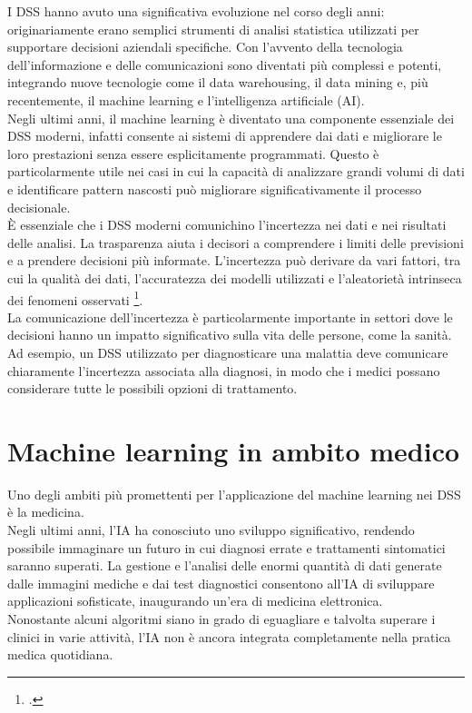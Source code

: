 I DSS hanno avuto una significativa evoluzione nel corso degli anni: originariamente erano semplici strumenti di analisi statistica utilizzati per supportare decisioni aziendali specifiche. Con l'avvento della tecnologia dell'informazione e delle comunicazioni sono diventati più complessi e potenti, integrando nuove tecnologie come il data warehousing, il data mining e, più recentemente, il machine learning e l'intelligenza artificiale (AI).\\
Negli ultimi anni, il machine learning è diventato una componente essenziale dei DSS moderni, infatti consente ai sistemi di apprendere dai dati e migliorare le loro prestazioni senza essere esplicitamente programmati. Questo è particolarmente utile nei casi in cui la capacità di analizzare grandi volumi di dati e identificare pattern nascosti può migliorare significativamente il processo decisionale.\\
È essenziale che i DSS moderni comunichino l'incertezza nei dati e nei risultati delle analisi. La trasparenza aiuta i decisori a comprendere i limiti delle previsioni e a prendere decisioni più informate. L'incertezza può derivare da vari fattori, tra cui la qualità dei dati, l'accuratezza dei modelli utilizzati e l'aleatorietà intrinseca dei fenomeni osservati \footcite{womak:role-decision-making}.\\
La comunicazione dell'incertezza è particolarmente importante in settori dove le decisioni hanno un impatto significativo sulla vita delle persone, come la sanità. Ad esempio, un DSS utilizzato per diagnosticare una malattia deve comunicare chiaramente l'incertezza associata alla diagnosi, in modo che i medici possano considerare tutte le possibili opzioni di trattamento.\\


\section{Machine learning in ambito medico }

Uno degli ambiti più promettenti per l'applicazione del machine learning nei DSS è la medicina. \\
Negli ultimi anni, l'IA ha conosciuto uno sviluppo significativo, rendendo possibile immaginare un futuro in cui diagnosi errate e trattamenti sintomatici saranno superati. La gestione e l'analisi delle enormi quantità di dati generate dalle immagini mediche e dai test diagnostici consentono all'IA di sviluppare applicazioni sofisticate, inaugurando un'era di medicina elettronica.\\
Nonostante alcuni algoritmi siano in grado di eguagliare e talvolta superare i clinici in varie attività, l'IA non è ancora integrata completamente nella pratica medica quotidiana.\\

